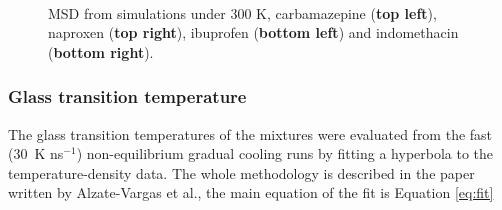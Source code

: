 \begin{figure}[H]
	\centering
	\\
	\caption{MSD from simulations under 300 K, carbamazepine (\textbf{top left}), naproxen (\textbf{top right}), ibuprofen (\textbf{bottom left}) and indomethacin (\textbf{bottom right}).}
	\label{fig:msd_r1}    
\end{figure}

\subsubsection{Glass transition temperature}
The glass transition temperatures of the mixtures were evaluated from the fast (30~K ns$^{-1}$) non-equilibrium gradual cooling runs by fitting a hyperbola to the temperature-density data. The whole methodology is described in the paper written by Alzate-Vargas et al.\cite{alzate-vargas_uncertainties_2018}, the main equation of the fit is Equation \ref{eq:fit}


